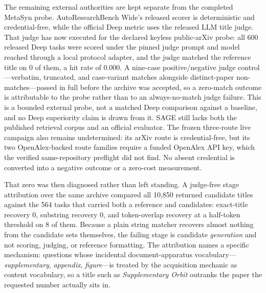 The remaining external authorities are kept separate from the completed MetaSyn
probe.  AutoResearchBench Wide's released scorer is deterministic and
credential-free, while the official Deep metric uses the released LLM title
judge.  That judge has now executed for the declared keyless public-arXiv
probe: all 600 released Deep tasks were scored under the pinned judge prompt
and model reached through a local protocol adapter, and the judge matched the
reference title on 0 of them, a hit rate of 0.000.  A nine-case
positive/negative judge control---verbatim, truncated, and case-variant
matches alongside distinct-paper non-matches---passed in full before the
archive was accepted, so a zero-match outcome is attributable to the probe
rather than to an always-no-match judge failure.  This is a bounded external
probe, not a matched Deep comparison against a baseline, and no Deep
superiority claim is drawn from it.  SAGE still lacks both the published
retrieval corpus and an official evaluator.  The frozen three-route live
campaign also remains undetermined: its arXiv route is credential-free,
but its two OpenAlex-backed route families require a funded OpenAlex API key,
which the verified same-repository preflight did not
find.  No absent credential is converted into a negative outcome or a zero-cost
measurement.

That zero was then diagnosed rather than left standing.  A judge-free stage
attribution over the same archive compared all 10,850 returned candidate titles
against the 564 tasks that carried both a reference and candidates: exact-title
recovery 0, substring recovery 0, and token-overlap recovery at a half-token
threshold on 8 of them.  Because a plain string matcher
recovers almost nothing from the candidate sets themselves, the failing stage is
candidate \emph{generation} and not scoring, judging, or reference formatting.
The attribution names a specific mechanism: questions whose incidental
document-apparatus vocabulary---\emph{supplementary}, \emph{appendix},
\emph{figure}---is treated by the acquisition mechanic as content vocabulary, so
a title such as \emph{Supplementary Orbit} outranks the paper the requested
number actually sits in.

